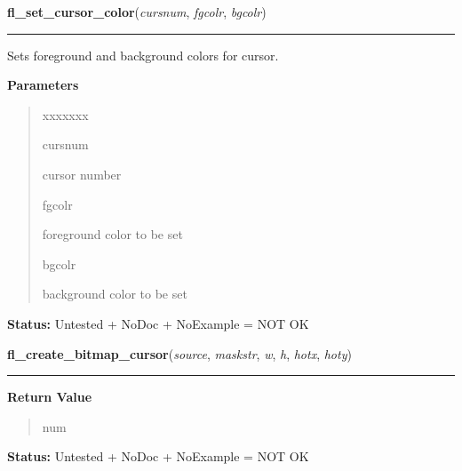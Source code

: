\hspace{.8\funcindent}\begin{boxedminipage}{\funcwidth}

    \raggedright \textbf{fl\_set\_cursor\_color}(\textit{cursnum}, \textit{fgcolr}, \textit{bgcolr})

    \vspace{-1.5ex}

    \rule{\textwidth}{0.5\fboxrule}
\setlength{\parskip}{2ex}
    Sets foreground and background colors for cursor.

\setlength{\parskip}{1ex}
      \textbf{Parameters}
      \vspace{-1ex}

      \begin{quote}
        \begin{Ventry}{xxxxxxx}

          \item[cursnum]

          cursor number

          \item[fgcolr]

          foreground color to be set

          \item[bgcolr]

          background color to be set

        \end{Ventry}

      \end{quote}

\textbf{Status:} Untested + NoDoc + NoExample = NOT OK



    \end{boxedminipage}

    \label{xformslib:library:fl_create_bitmap_cursor}

    \vspace{0.5ex}

\hspace{.8\funcindent}\begin{boxedminipage}{\funcwidth}

    \raggedright \textbf{fl\_create\_bitmap\_cursor}(\textit{source}, \textit{maskstr}, \textit{w}, \textit{h}, \textit{hotx}, \textit{hoty})

    \vspace{-1.5ex}

    \rule{\textwidth}{0.5\fboxrule}
\setlength{\parskip}{2ex}
\setlength{\parskip}{1ex}
      \textbf{Return Value}
    \vspace{-1ex}

      \begin{quote}
      num

      \end{quote}

\textbf{Status:} Untested + NoDoc + NoExample = NOT OK



    \end{boxedminipage}

